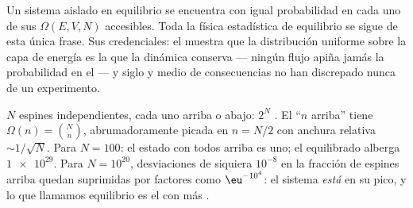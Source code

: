 \begin{theorem}\label{thm:b3:microcanonical-ensemble:postulate}
Un sistema aislado en equilibrio se encuentra con igual probabilidad en
cada uno de sus $\Omega(E, V, N)$  accesibles. Toda la física
estadística de equilibrio se sigue de esta única frase.
Sus credenciales: el  muestra que la distribución
uniforme sobre la capa de energía es la que la dinámica conserva --- ningún
flujo apiña jamás la probabilidad en el  --- y siglo y medio
de consecuencias no han discrepado nunca de un experimento.
\end{theorem}
\admitted

\begin{example}\label{ex:b3:microcanonical-ensemble:spins}
$N$ espines independientes, cada uno arriba o abajo: $2^N$ . El
 ``$n$ arriba'' tiene  $\Omega(n) = \binom Nn$,
abrumadoramente picada en $n = N/2$ con anchura relativa
$\sim1/\sqrt N$. Para $N = 100$: el estado con todos arriba es uno; el
 equilibrado alberga $\num{1e29}$. Para $N = 10^{20}$,
desviaciones de siquiera $10^{-8}$ en la fracción de espines arriba quedan
suprimidas por factores como $\eu^{-10^4}$: el sistema \emph{está} en su
pico, y lo que llamamos equilibrio es el  con más
.
\end{example}

